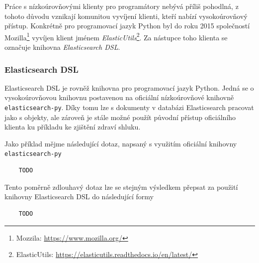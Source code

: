Práce s nízkoúrovňovými klienty pro programátory nebývá příliš pohodlná, z tohoto důvodu vznikají komunitou vyvíjení klienti, kteří nabízí vysokoúrovňový přístup. Konkrétně pro programovací jazyk Python byl do roku 2015 společností Mozilla\footnote{Mozzila: \url{https://www.mozilla.org/}} vyvíjen klient jménem \emph{ElasticUtils}\footnote{ElasticUtils: \url{https://elasticutils.readthedocs.io/en/latest/}}. Za nástupce toho klienta se označuje knihovna \emph{Elasticsearch DSL}.

\subsubsection*{Elasticsearch DSL}
Elasticsearch DSL je rovněž knihovna pro programovací jazyk Python. Jedná se o vysokoúrovňovou knihovnu postavenou na oficiální nízkoúrovňové knihovně \texttt{elasticsearch-py}. Díky tomu lze s dokumenty v databázi Elasticsearch pracovat jako s objekty, ale zároveň je stále možné použít původní přístup oficiálního klienta  ku příkladu ke zjištění zdraví shluku.

Jako příklad mějme následující dotaz, napsaný s využitím oficiální knihovny \texttt{elasticsearch-py} 
\begin{verbatim}
    TODO
\end{verbatim}

Tento poměrně zdlouhavý dotaz lze se stejným výsledkem přepsat za použití knihovny Elasticsearch DSL do následující formy

\begin{verbatim}
    TODO
\end{verbatim}

\blindtext[2]